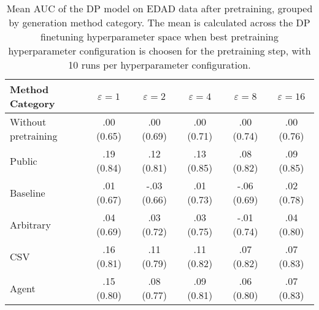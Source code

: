 \begin{table}[h!]
    \centering
    \caption{Mean AUC of the DP model on EDAD data after pretraining, grouped by generation method category. The mean is calculated across the DP finetuning hyperparameter space when best pretraining hyperparameter configuration is choosen for the pretraining step, with 10 runs per hyperparameter configuration.}
    \label{tab:epsilon_comparison}
    \begin{tabular}{lccccc}
    \toprule
    Method Category & $\varepsilon=1$ & $\varepsilon=2$ & $\varepsilon=4$ & $\varepsilon=8$ & $\varepsilon=16$ \\
    \midrule
    Without pretraining & .00 {\small (0.65)} & .00 {\small (0.69)} & .00 {\small (0.71)} & .00 {\small (0.74)} & .00 {\small (0.76)} \\
    \arrayrulecolor{black!50!}\midrule
    Public & \cellcolor{gold!30}.19 {\small (0.84)} & \cellcolor{gold!30}.12 {\small (0.81)} & \cellcolor{gold!30}.13 {\small (0.85)} & \cellcolor{gold!30}.08 {\small (0.82)} & \cellcolor{gold!30}.09 {\small (0.85)} \\
    \arrayrulecolor{black!50!}\midrule
    Baseline & .01 {\small (0.67)} & -.03 {\small (0.66)} & .01 {\small (0.73)} & -.06 {\small (0.69)} & .02 {\small (0.78)} \\
    \arrayrulecolor{black!50!}\midrule
    Arbitrary & .04 {\small (0.69)} & .03 {\small (0.72)} & .03 {\small (0.75)} & -.01 {\small (0.74)} & .04 {\small (0.80)} \\
    \arrayrulecolor{black!50!}\midrule
    CSV & \cellcolor{silver!30}.16 {\small (0.81)} & \cellcolor{silver!30}.11 {\small (0.79)} & \cellcolor{silver!30}.11 {\small (0.82)} & \cellcolor{silver!30}.07 {\small (0.82)} & \cellcolor{silver!30}.07 {\small (0.83)} \\
    Agent & \cellcolor{bronze!30}.15 {\small (0.80)} & \cellcolor{bronze!30}.08 {\small (0.77)} & \cellcolor{bronze!30}.09 {\small (0.81)} & \cellcolor{bronze!30}.06 {\small (0.80)} & \cellcolor{bronze!30}.07 {\small (0.83)} \\
    \bottomrule
    \end{tabular}
\end{table}